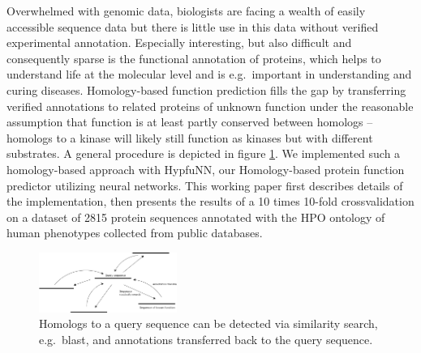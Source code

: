 Overwhelmed with genomic data, biologists are facing a wealth of easily accessible sequence data but there is little use in this data without verified experimental annotation. Especially interesting, but also difficult and consequently sparse is the functional annotation of proteins, which helps to understand life at the molecular level and is e.g.~important in understanding and curing diseases. Homology-based function prediction fills the gap by transferring verified annotations to related proteins of unknown function under the reasonable assumption that function is at least partly conserved between homologs -- homologs to a kinase will likely still function as kinases but with different substrates. A general procedure is depicted in figure \ref{fig:function_transfer}. We implemented such a homology-based approach with HypfuNN, our Homology-based protein function predictor utilizing neural networks. This working paper first describes details of the implementation, then presents the results of a 10 times 10-fold crossvalidation on a dataset of 2815 protein sequences annotated with the HPO ontology of human phenotypes collected from public databases.

\begin{figure}[!hb]
\includegraphics[width = 0.4\textwidth]{figures/function_transfer.png}
\caption{Homologs to a query sequence can be detected via similarity search, e.g.~blast, and annotations transferred back to the query sequence.}
\label{fig:function_transfer}
\end{figure}
